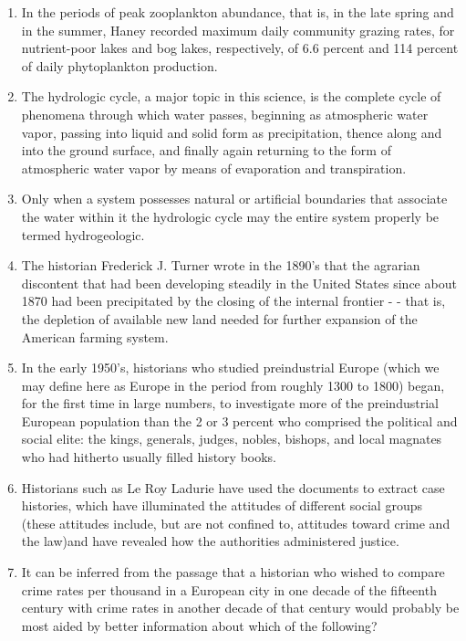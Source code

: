 \begin{enumerate}
\item In the periods of peak zooplankton abundance, that is, in the late spring and in the summer,   Haney recorded maximum daily community grazing rates, for nutrient-poor lakes and bog lakes,  respectively, of 6.6 percent and 114 percent of daily phytoplankton production. 

\item The hydrologic cycle, a major topic in this science, is the complete cycle of phenomena through which water passes, beginning as atmospheric water vapor, passing into liquid and solid form as precipitation, thence along and into the ground surface, and finally again returning to the form of atmospheric water vapor by means of evaporation and transpiration.


\item Only when a system possesses natural or artificial boundaries that associate the water within it the hydrologic cycle may the entire system properly be termed hydrogeologic.

\item The historian Frederick J. Turner wrote in the 1890's that the agrarian discontent that had been developing steadily in the United States since about 1870 had been precipitated by the  closing of the internal frontier  -  - that is, the depletion of available new land needed for further expansion of the American farming system.

\item In the early 1950's, historians who studied preindustrial Europe (which we may define here as Europe in the period from roughly 1300 to 1800) began,  for the first time in large numbers, to  investigate more of the preindustrial European population than the 2 or 3 percent who comprised the political and social elite:  the kings, generals, judges, nobles,  bishops, and local magnates who had hitherto usually filled history books. 

\item Historians such as Le Roy Ladurie have used the documents to extract case histories,  which have illuminated the attitudes of different social groups (these attitudes include, but are not  confined to, attitudes toward crime and the law)and have revealed how the authorities administered justice. 

\item It can be inferred from the passage that a historian who wished to compare crime rates per thousand in a European city in one decade of the fifteenth century with crime rates in another decade of that century would probably be most aided by better information about which of the following?  


\end{enumerate}

